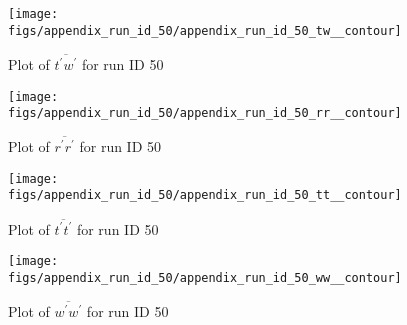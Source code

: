 \begin{figure}[H]
\centering
\texttt{[image: figs/appendix\_run\_id\_50/appendix\_run\_id\_50\_tw\_\_contour]}
\caption{Plot of $\overline{t^\prime w^\prime}$ for run ID 50}
\label{fig:appendix_run_id_50_tw__contour}
\end{figure}


\begin{figure}[H]
\centering
\texttt{[image: figs/appendix\_run\_id\_50/appendix\_run\_id\_50\_rr\_\_contour]}
\caption{Plot of $\overline{r^\prime r^\prime}$ for run ID 50}
\label{fig:appendix_run_id_50_rr__contour}
\end{figure}


\begin{figure}[H]
\centering
\texttt{[image: figs/appendix\_run\_id\_50/appendix\_run\_id\_50\_tt\_\_contour]}
\caption{Plot of $\overline{t^\prime t^\prime}$ for run ID 50}
\label{fig:appendix_run_id_50_tt__contour}
\end{figure}


\begin{figure}[H]
\centering
\texttt{[image: figs/appendix\_run\_id\_50/appendix\_run\_id\_50\_ww\_\_contour]}
\caption{Plot of $\overline{w^\prime w^\prime}$ for run ID 50}
\label{fig:appendix_run_id_50_ww__contour}
\end{figure}


